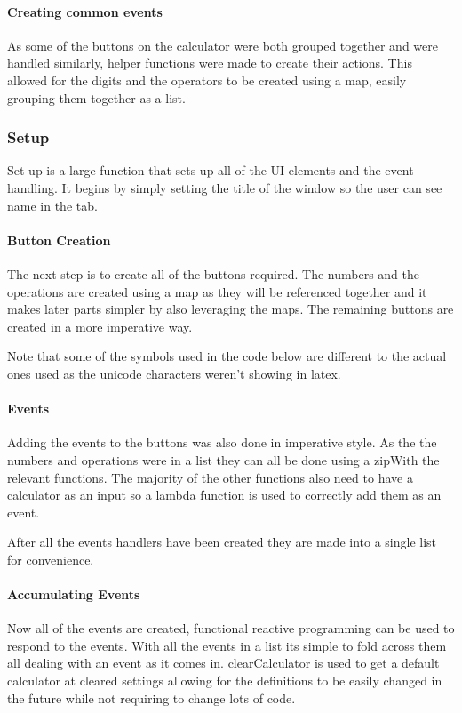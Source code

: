 \documentclass[a4paper]{article}
\begin{document}
\paragraph{Creating common events}
As some of the buttons on the calculator were both grouped together and were handled similarly, helper functions were made to create their actions.
This allowed for the digits and the operators to be created using a map, easily grouping them together as a list.


\subsubsection{Setup}
Set up is a large function that sets up all of the UI elements and the event handling.
It begins by simply setting the title of the window so the user can see name in the tab.


\paragraph{Button Creation}
The next step is to create all of the buttons required.
The numbers and the operations are created using a map as they will be referenced together and it makes later parts simpler by also leveraging the maps.
The remaining buttons are created in a more imperative way.
\par
Note that some of the symbols used in the code below are different to the actual ones used as the unicode characters weren't showing in latex.


\paragraph{Events}
Adding the events to the buttons was also done in imperative style.
As the the numbers and operations were in a list they can all be done using a zipWith the relevant functions.
The majority of the other functions also need to have a calculator as an input so a lambda function is used to correctly add them as an event.
\par
After all the events handlers have been created they are made into a single list for convenience.


\paragraph{Accumulating Events}
Now all of the events are created, functional reactive programming can be used to respond to the events.
With all the events in a list its simple to fold across them all dealing with an event as it comes in.
clearCalculator is used to get a default calculator at cleared settings allowing for the definitions to be easily changed in the future while not requiring to change lots of code.

\end{document}
